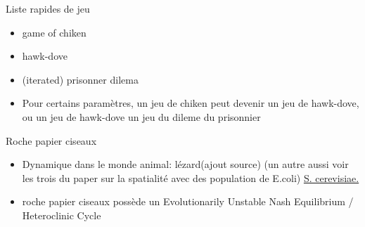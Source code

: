 \documentclass[aspectratio=169,xcolor=dvipsnames]{beamer}
\begin{document}
\begin{frame}{Liste rapides de jeu}
    \begin{itemize}
        \item game of chiken
        \item hawk-dove
        \item (iterated) prisonner dilema
        \item Pour certains paramètres, un jeu de chiken peut devenir un jeu de hawk-dove, ou un jeu de hawk-dove un jeu du dileme du prisonnier
    \end{itemize}
\end{frame}

\begin{frame}{Roche papier ciseaux}

    \begin{itemize}
        \item Dynamique dans le monde animal: lézard(ajout source) (un autre aussi voir les trois du paper sur la spatialité avec des population de E.coli) \href{https://www.nature.com/articles/306368a0}{\color{blue} S. cerevisiae.}
        \item roche papier ciseaux possède un Evolutionarily Unstable Nash Equilibrium / Heteroclinic Cycle
    \end{itemize}

\end{frame}
\end{document}
